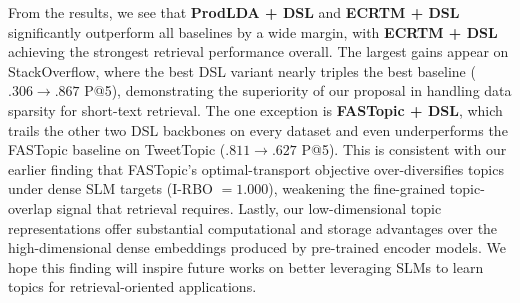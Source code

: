 \documentclass{article}
\theoremstyle{plain}
\theoremstyle{definition}
\theoremstyle{remark}
\begin{document}
From the results, we see that \textbf{ProdLDA + DSL} and
\textbf{ECRTM + DSL} significantly outperform all baselines by a wide
margin, with \textbf{ECRTM + DSL} achieving the strongest retrieval
performance overall. The largest gains appear on StackOverflow, where
the best DSL variant nearly triples the best baseline ($.306 \to .867$
P@5), demonstrating the superiority of our proposal in handling data
sparsity for short-text retrieval. The one exception is
\textbf{FASTopic + DSL}, which trails the other two DSL backbones on
every dataset and even underperforms the FASTopic baseline on
TweetTopic ($.811 \to .627$ P@5). This is consistent with our earlier
finding that FASTopic's optimal-transport objective over-diversifies
topics under dense SLM targets (I-RBO $=1.000$), weakening the
fine-grained topic-overlap signal that retrieval requires.
Lastly, our low-dimensional topic representations offer substantial
computational and storage advantages over the high-dimensional dense
embeddings produced by pre-trained encoder models. We hope this
finding will inspire future works on better leveraging SLMs to learn
topics for retrieval-oriented applications.


\end{document}
